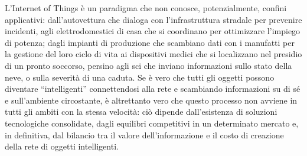 \noindent L’Internet of Things \cite{minteer2017analytics} è un paradigma che non conosce, potenzialmente, confini applicativi: dall’autovettura che dialoga con l’infrastruttura stradale per prevenire incidenti, agli elettrodomestici di casa che si coordinano per ottimizzare l’impiego di potenza; dagli impianti di produzione che scambiano dati con i manufatti per la gestione del loro ciclo di vita ai dispositivi medici che si localizzano nel presidio di un pronto soccorso, persino agli sci che inviano informazioni sullo stato della neve, o sulla severità di una caduta. Se è vero che tutti gli oggetti possono diventare “intelligenti” connettendosi alla rete e scambiando informazioni su di sé e sull’ambiente circostante, è altrettanto vero che questo processo non avviene in tutti gli ambiti con la stessa velocità: ciò dipende dall’esistenza di soluzioni tecnologiche consolidate, dagli equilibri competitivi in un determinato mercato e, in definitiva, dal bilancio tra il valore dell’informazione e il costo di creazione della rete di oggetti intelligenti.\\

